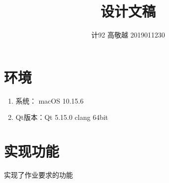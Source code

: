 \documentclass[utf-8]{ctexart}
\begin{document}
\title{设计文稿}
\author{计92 高敬越 2019011230}
\date{ }
    \maketitle
    \vspace{-2em}
    \section{环境}
    \begin{enumerate}
        \item 系统： macOS 10.15.6
        \item Qt版本：Qt 5.15.0 clang 64bit 
    \end{enumerate}
    \section{实现功能}
    实现了作业要求的功能
\end{document}
